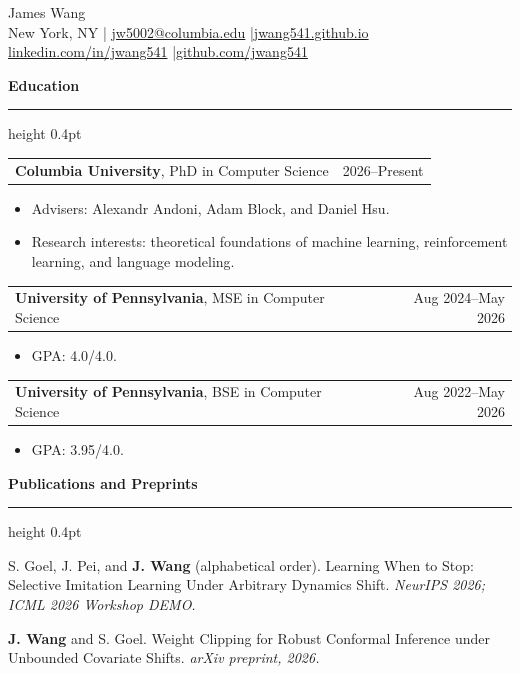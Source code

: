 \documentclass[10pt,letterpaper]{article}
\makeatletter
\newcommand{\cvsection}[1]{%
  \par\addpenalty{-300}\addvspace{12pt}%
  {\large\bfseries #1\par}%
  \nobreak\vspace{3pt}\hrule height 0.4pt%
  \nobreak\vspace{6pt}\nobreak
}
\newcommand{\entrysep}{\par\addvspace{6pt}}
\newcommand{\entry}[2]{\noindent\begin{tabularx}{\textwidth}{@{}Xr@{}}#1 & #2\end{tabularx}\par\nobreak\vspace{2pt}}
\makeatother
\begin{document}
\begingroup
\centering
{\fontsize{25}{28}\selectfont James Wang}\\[5pt]
New York, NY \enspace|\enspace
\href{mailto:jw5002@columbia.edu}{jw5002@columbia.edu}
\enspace|\enspace \href{https://jwang541.github.io/}{jwang541.github.io}\\[2pt]
\href{https://linkedin.com/in/jwang541}{linkedin.com/in/jwang541}
\enspace|\enspace \href{https://github.com/jwang541}{github.com/jwang541}
\par
\endgroup
\addvspace{8pt}

\cvsection{Education}
\begin{samepage}
\entry{\textbf{Columbia University}, PhD in Computer Science}{2026--Present}
\begin{itemize}
\item Advisers: Alexandr Andoni, Adam Block, and Daniel Hsu.
\item Research interests: theoretical foundations of machine learning, reinforcement learning, and language modeling.
\end{itemize}
\end{samepage}\entrysep
\begin{samepage}
\entry{\textbf{University of Pennsylvania}, MSE in Computer Science}{Aug 2024--May 2026}
\begin{itemize}
\item GPA: 4.0/4.0.
\end{itemize}
\end{samepage}\entrysep
\begin{samepage}
\entry{\textbf{University of Pennsylvania}, BSE in Computer Science}{Aug 2022--May 2026}
\begin{itemize}
\item GPA: 3.95/4.0.
\end{itemize}
\end{samepage}\entrysep
\cvsection{Publications and Preprints}
\begin{samepage}
S. Goel, J. Pei, and \textbf{J. Wang} (alphabetical order). Learning When to Stop: Selective Imitation Learning Under Arbitrary Dynamics Shift. \textit{NeurIPS 2026; ICML 2026 Workshop DEMO.}\par
\end{samepage}\entrysep
\begin{samepage}
\textbf{J. Wang} and S. Goel. Weight Clipping for Robust Conformal Inference under Unbounded Covariate Shifts. \textit{arXiv preprint, 2026.}\par
\end{samepage}\entrysep
\end{document}
